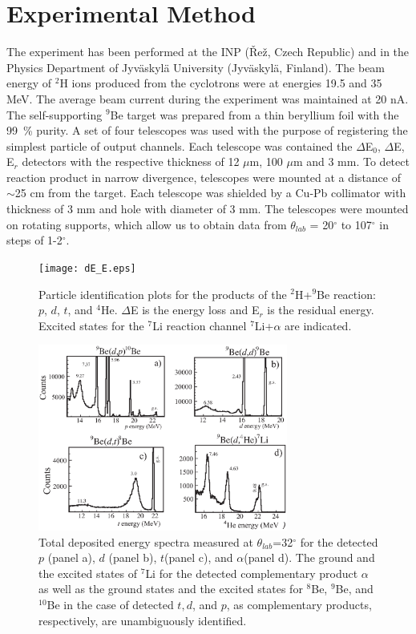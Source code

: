 \documentclass[10pt]{iopart}
\begin{document}
\section{Experimental Method}
The experiment has been performed at  the INP (\v{R}e\v{z}, Czech Republic) and  in the Physics Department of Jyv\"{a}skyl\"{a} University (Jyv\"askyl\"a, Finland).  The beam energy of $^2$H ions produced from the cyclotrons were at energies 19.5 and 35 MeV. The average beam current during the experiment was maintained at 20 nA. The self-supporting $^9$Be target was prepared from a thin beryllium foil with the 99~\% purity. A set of four telescopes was used with the purpose of registering the simplest particle of output channels. Each telescope was  contained the $\Delta$E$_0$, $\Delta$E, E$_r$ detectors with the respective thickness of 12 $\mu$m, 100 $\mu$m and 3 mm.
To detect reaction product in narrow divergence,  telescopes were mounted at a distance of $\sim$25 cm from the target. Each telescope was shielded by a Cu-Pb collimator with thickness of 3 mm and hole with diameter of 3 mm. The telescopes were mounted on rotating supports, which allow us to obtain data from $\theta_{lab}$ = 20$^\circ$ to 107$^\circ$ in steps of 1-2$^\circ$.

\begin{figure}[tp]
\centering
\texttt{[image: dE\_E.eps]}
\caption{Particle identification plots for the products of the $^{2}$H+$^9$Be reaction: $p$, $d$, $t$, and $^{4}$He. $\Delta$E is the energy loss and E$_r$ is the residual energy. Excited states for the $^7$Li reaction channel $^7$Li+$\alpha$ are indicated.}
\label{fig1}
\end{figure}

\begin{figure}[tp]
 \includegraphics[width=8.2cm]{d_Etot_Fig2.eps}
\caption{Total deposited energy spectra measured at $\theta_{lab}$=32$^\circ$ for the detected $p$ (panel a), $d$ (panel b), $t$(panel c), and $\alpha$(panel d). The ground and the excited states of $^7$Li for the detected complementary product $\alpha$ as well as the ground states and the excited states for $^8$Be, $^9$Be, and $^{10}$Be in the case of detected $t, d$, and $p$, as complementary products, respectively, are unambiguously identified.}
\label{fig2}
\end{figure}	
\end{document}
